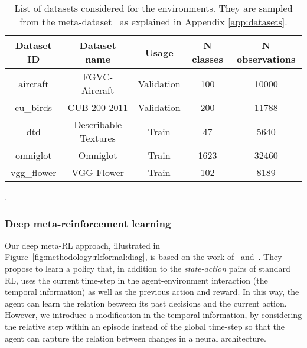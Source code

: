 \begin{table}[ht]
\centering
\begin{tabular}{@{}ccccc@{}}
\toprule
Dataset ID    & Dataset name                              & Usage      & N classes & N observations \\ \midrule
aircraft      & FGVC-Aircraft                             & Validation & 100       & 10000          \\
cu\_birds     & CUB-200-2011                              & Validation & 200       & 11788          \\
dtd           & Describable Textures                      & Train      & 47        & 5640           \\
omniglot      & Omniglot                                  & Train      & 1623      & 32460          \\
vgg\_flower   & VGG Flower                                & Train      & 102       & 8189           \\ \bottomrule
\end{tabular}
\caption{List of datasets considered for the environments. They are sampled from the meta-dataset~\citep{MetaDataset} as explained in Appendix \ref{app:datasets}.}.
\label{tab:methodology:environments:datasets}
\end{table}

\subsubsection{Deep meta-reinforcement learning}\label{sec:methodology:rl:dmrl}

Our deep meta-RL approach, illustrated in Figure~\ref{fig:methodology:rl:formal:diag}, is based on the work of~\citet{LtRL} and~\citet{RL2}. They propose to learn a policy that, in addition to the \textit{state-action} pairs of standard RL, uses the current time-step in the agent-environment interaction (the temporal information) as well as the previous action and reward. In this way, the agent can learn the relation between its past decisions and the current action. However, we introduce a modification in the temporal information, by considering the relative step within an episode instead of the global time-step so that the agent can capture the relation between changes in a neural architecture.

